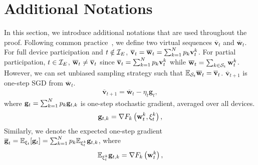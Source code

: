 
\section{Additional Notations}
\label{sec:app:notations}
In this section, we introduce additional notations that are used throughout
the proof. Following common practice~\cite{stich2018local,li2019convergence}, we define two virtual sequences $\overline{\mathbf{v}}_{t}$ and $\overline{\mathbf{w}}_{t}$. For full device participation and $t \notin {\mathcal{I}}_E$,
${\overline{\mathbf{v}}}_t = {\overline{\mathbf{w}}}_t =\sum_{k=1}^{N} p_{k} \mathbf{v}_{t}^{k}$. For partial participation, $t \in {\mathcal{I}}_E$, ${\overline{\mathbf{w}}}_t \neq {\overline{\mathbf{v}}}_t$ since ${\overline{\mathbf{v}}}_t=\sum_{k=1}^{N} p_{k} \mathbf{v}_{t}^{k}$ while ${\overline{\mathbf{w}}}_t=\sum_{k\in {\mathcal{S}}_t}\mathbf{w}_{t}^{k}$. However, we can
set unbiased sampling strategy such that $ \mathbb{E}_{{\mathcal{S}}_t} {\overline{\mathbf{w}}}_t = {\overline{\mathbf{v}}}_t$.
$\overline{\mathbf{v}}_{t+1}$ is one-step SGD from $\overline{\mathbf{w}}_{t}$. 
\begin{align}
\overline{\mathbf{v}}_{t+1}=\overline{\mathbf{w}}_{t}-\eta_{t} \mathbf{g}_{t},	\label{eq:vbar}
\end{align}
where ${\mathbf{g}}_{t} = \sum_{k=1}^{N} p_{k} {\mathbf{g}}_{t,k} $ is one-step stochastic gradient, averaged over all devices. 
\begin{align*}
{\mathbf{g}}_{t,k} = \nabla F_{k}\left(\mathbf{w}_{t}^{k},\mathbf{\xi}_{t}^{k} \right),   
\end{align*}
Similarly, we denote the expected one-step gradient ${\overline{\mathbf{g}}}_{t}= \mathbb{E}_{\xi_t}[{\mathbf{g}}_t] = \sum_{k=1}^{N} p_{k} \mathbb{E}_{\mathbf{\xi}_{t}^{k}} {\mathbf{g}}_{t,k}$, where
\begin{align*}
\mathbb{E}_{\mathbf{\xi}_{t}^{k}} {\mathbf{g}}_{t,k}  = \nabla F_{k}\left(\mathbf{w}_{t}^{k}\right), 
\end{align*}
